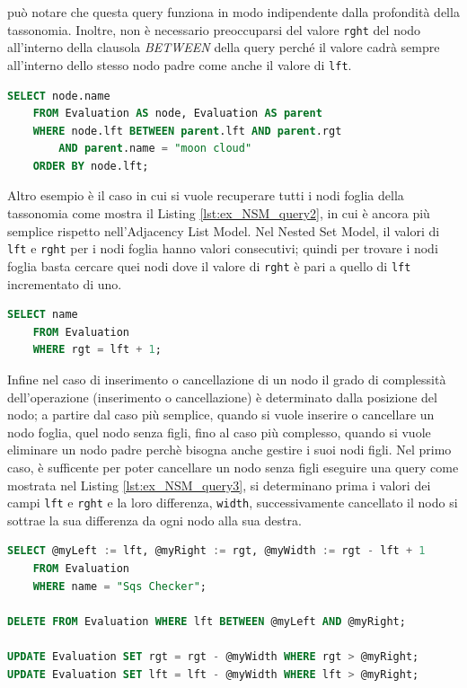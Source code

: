 può notare che questa query funziona in modo indipendente dalla profondità della tassonomia. Inoltre, non è necessario preoccuparsi del valore \texttt{rght} 
del nodo all'interno della clausola \textit{BETWEEN} della query perché il valore cadrà sempre all'interno dello stesso nodo padre come anche il 
valore di \texttt{lft}.
\begin{lstlisting}[language=SQL, label=lst:ex_NSM_query, caption={Query in puro Sql per recuperare l'intera tassonomia delle Evaluation, 
    secondo il Nested Set Model.}]
SELECT node.name
    FROM Evaluation AS node, Evaluation AS parent
    WHERE node.lft BETWEEN parent.lft AND parent.rgt
        AND parent.name = "moon cloud"
    ORDER BY node.lft;
\end{lstlisting}
%
Altro esempio è il caso in cui si vuole recuperare tutti i nodi foglia della tassonomia come mostra il Listing \ref{lst:ex_NSM_query2}, in cui è ancora 
più semplice rispetto nell'Adjacency List Model. Nel Nested Set Model, il valori di \texttt{lft} e \texttt{rght} per i nodi foglia hanno valori 
consecutivi; quindi per trovare i nodi foglia basta cercare quei nodi dove il valore di \texttt{rght} è pari a quello di \texttt{lft} incrementato di uno.
\begin{lstlisting}[language=SQL, label=lst:ex_NSM_query2, caption={Query in puro Sql per recuperare tutti i nodi foglia della tassonomia delle Evaluation, 
    secondo il Nested Set Model.}]
SELECT name
    FROM Evaluation
    WHERE rgt = lft + 1;
\end{lstlisting}
%
Infine nel caso di inserimento o cancellazione di un nodo il grado di complessità dell'operazione (inserimento o cancellazione) è determinato dalla 
posizione del nodo; a partire dal caso più semplice, quando si vuole inserire o cancellare un nodo foglia, quel nodo senza figli, fino 
al caso più complesso, quando si vuole eliminare un nodo padre perchè bisogna anche gestire i suoi nodi figli.
Nel primo caso, è sufficente per poter cancellare un nodo senza figli eseguire una query come mostrata nel Listing \ref{lst:ex_NSM_query3}, si determinano 
prima i valori dei campi \texttt{lft} e \texttt{rght} e la loro differenza, \texttt{width}, successivamente cancellato il nodo si sottrae la sua 
differenza da ogni nodo alla sua destra.
\begin{lstlisting}[language=SQL, label=lst:ex_NSM_query3, caption={Query in puro Sql per eliminare un nodo foglia dalla tassonomia delle Evaluation, 
    secondo il Nested Set Model.}]
SELECT @myLeft := lft, @myRight := rgt, @myWidth := rgt - lft + 1
    FROM Evaluation
    WHERE name = "Sqs Checker";

DELETE FROM Evaluation WHERE lft BETWEEN @myLeft AND @myRight;

UPDATE Evaluation SET rgt = rgt - @myWidth WHERE rgt > @myRight;
UPDATE Evaluation SET lft = lft - @myWidth WHERE lft > @myRight;
\end{lstlisting}
